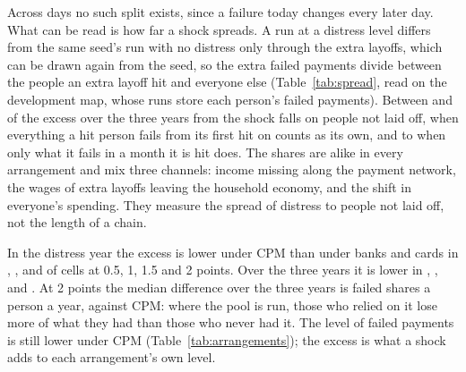 Across days no such split exists, since a failure today changes every later day. What can be read is how far a
shock spreads. A run at a distress level differs from the same seed's run with no distress only through the extra
layoffs, which can be drawn again from the seed, so the extra failed payments divide between the people an
extra layoff hit and everyone else (Table~\ref{tab:spread}, read on the development map, whose runs store each
person's failed payments). Between \SpreadWideLow{} and \SpreadWideHigh{} of the
excess over the three years from the shock falls on people not laid off, when everything a hit person
fails from its first hit on counts as its own, and \SpreadNarrowLow{} to \SpreadNarrowHigh{} when only what it
fails in a month it is hit does. The shares are alike in every arrangement and mix three channels: income
missing along the payment network, the wages of extra layoffs leaving the household economy, and the shift in
everyone's spending. They measure the spread of distress to people not laid off, not the length of a chain.

In the distress year the excess is lower under CPM than under banks and cards in \SpreadLowerYearHalf{},
\SpreadLowerYearOne{}, \SpreadLowerYearOneHalf{} and \SpreadLowerYearTwo{} of \SpreadCells{} cells at 0.5, 1, 1.5
and 2 points. Over the three years it is lower in \SpreadLowerHalf{}, \SpreadLowerOne{}, \SpreadLowerOneHalf{} and
\SpreadLowerTwo{}. At 2 points the median difference over the three years is \SpreadGapTwo{} failed shares a person
a year, against CPM: where the pool is run, those who relied on it lose more of what they had than those who
never had it. The level of failed payments is still lower under CPM (Table~\ref{tab:arrangements}); the excess is what a
shock adds to each arrangement's own level.

\begin{table}[htbp]\centering\small
\resizebox{\linewidth}{!}{}
\caption{Failure passed on within a day, on six cells (an outside rate of 4.4\%; launch participation of 5\%, 20\%
and 60\%): the share of failed value that fails only because receipts were short, the payers with such a failure a
day, the share of days when 32 or more payers had one, and the payments that rest on a closed loop of payers
without money. Medians and ranges over the three launch levels of the seed means.}
\label{tab:chains}
\end{table}

\begin{table}[htbp]\centering\small
\resizebox{\linewidth}{!}{}
\caption{The extra failed payments at a distress level over the same seed's run with no distress, in failed shares
of bills and wages a person a year, over the three years from the shock and in the distress year: medians and
ranges over the 21 cells of a level of the seed means, with the share that falls on people no extra layoff hit.}
\label{tab:spread}
\end{table}

